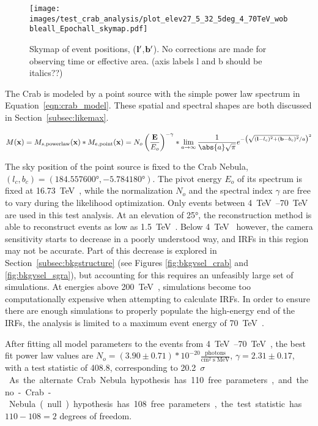   \begin{figure}[h]
    \centering
    \texttt{[image: images/test\_crab\_analysis/plot\_elev27\_5\_32\_5deg\_4\_70TeV\_wobbleall\_Epochall\_skymap.pdf]}
    \caption[Crab Counts Skymap]
    {
      Skymap of event positions, ($\mathbf{l'}$,$\mathbf{b'}$).
      No corrections are made for observing time or effective area.
      {\color{red}(axis labels l and b should be italics??)}
    }
    \label{fig:crab_skymap}
  \end{figure}
  
  The Crab is modeled by a point source with the simple power law spectrum in Equation~\ref{eqn:crab_model}.
  These spatial and spectral shapes are both discussed in Section~\ref{subsec:likemax}.

  \begin{equation}\label{eqn:crab_model}
    M(\xtrue) = M_{s,\textrm{powerlaw}}(\xtrue) * M_{e,\textrm{point}}(\xtrue) = N_o \left ( \frac{\Etrue}{E_o} \right )^{-\gamma} * \lim_{a\to\infty} \frac{1}{ \abs{a} \sqrt{\pi} } e^{ - \left ( \sqrt{ (\ltrue-l_c)^2 + (\btrue-b_c)^2 }/a \right )^2 }
  \end{equation}

  The sky position of the point source is fixed to the Crab Nebula, $(l_c,b_c) = (\ang{184.557600},\ang{-5.784180})$.
  The pivot energy $E_o$ of its spectrum is fixed at \SI{16.73}{\TeV{}}, while the normalization $N_o$ and the spectral index $\gamma$ are free to vary during the likelihood optimization.
  Only events between \SIrange{4}{70}{\TeV{}} are used in this test analysis.
  At an elevation of \ang{25}, the reconstruction method is able to reconstruct events as low as \SI{1.5}{\TeV{}}.
  Below \SI{4}{\TeV{}} however, the camera sensitivity starts to decrease in a poorly understood way, and IRFs in this region may not be accurate.
  Part of this decrease is explored in Section~\ref{subsec:bkgstructure} (see Figures \ref{fig:bkgvsel_crab} and \ref{fig:bkgvsel_sgra}), but accounting for this requires an unfeasibly large set of simulations.
  At energies above \SI{200}{\TeV{}}, simulations become too computationally expensive when attempting to calculate IRFs.
  In order to ensure there are enough simulations to properly populate the high-energy end of the IRFs, the analysis is limited to a maximum event energy of \SI{70}{\TeV{}}.
    
  After fitting all model parameters to the events from \SIrange{4}{70}{\TeV{}}, the best fit power law values are $ N_o = \left(3.90\pm0.71\right)*10^{-20} \frac{\textrm{photons}}{\textrm{cm}^{2} \; \textrm{s} \; \textrm{MeV} } $, $ \gamma = 2.31 \pm 0.17 $, with a test statistic of 408.8, corresponding to \nicetilde{}\SI{20.2}{$\sigma$}.
  As the alternate Crab Nebula hypothesis has 110 free parameters, and the no-Crab-Nebula (null) hypothesis has 108 free parameters, the test statistic has $ 110 - 108 = 2 $ degrees of freedom.
  
